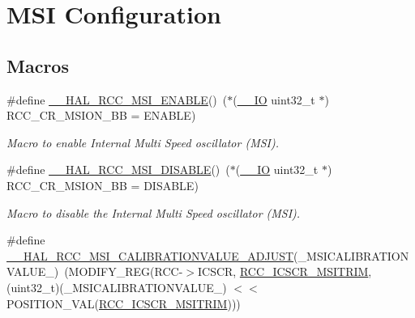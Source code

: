 \hypertarget{group___r_c_c___m_s_i___configuration}{\section{M\-S\-I Configuration}
\label{group___r_c_c___m_s_i___configuration}
}
\subsection*{Macros}
\begin{DoxyCompactItemize}
\item 
\#define \hyperlink{group___r_c_c___m_s_i___configuration_gaf6797e8502d134483ba092f5d4345c70}{\-\_\-\-\_\-\-H\-A\-L\-\_\-\-R\-C\-C\-\_\-\-M\-S\-I\-\_\-\-E\-N\-A\-B\-L\-E}()~($\ast$(\hyperlink{core__sc300_8h_aec43007d9998a0a0e01faede4133d6be}{\-\_\-\-\_\-\-I\-O} uint32\-\_\-t $\ast$) R\-C\-C\-\_\-\-C\-R\-\_\-\-M\-S\-I\-O\-N\-\_\-\-B\-B = E\-N\-A\-B\-L\-E)
\begin{DoxyCompactList}\small\item\em Macro to enable Internal Multi Speed oscillator (M\-S\-I). \end{DoxyCompactList}\item 
\#define \hyperlink{group___r_c_c___m_s_i___configuration_ga49c15fd232bd099f020e508fe9c3cd12}{\-\_\-\-\_\-\-H\-A\-L\-\_\-\-R\-C\-C\-\_\-\-M\-S\-I\-\_\-\-D\-I\-S\-A\-B\-L\-E}()~($\ast$(\hyperlink{core__sc300_8h_aec43007d9998a0a0e01faede4133d6be}{\-\_\-\-\_\-\-I\-O} uint32\-\_\-t $\ast$) R\-C\-C\-\_\-\-C\-R\-\_\-\-M\-S\-I\-O\-N\-\_\-\-B\-B = D\-I\-S\-A\-B\-L\-E)
\begin{DoxyCompactList}\small\item\em Macro to disable the Internal Multi Speed oscillator (M\-S\-I). \end{DoxyCompactList}\item 
\#define \hyperlink{group___r_c_c___m_s_i___configuration_ga6c1e051a956f43b1895e8b6c0572c45e}{\-\_\-\-\_\-\-H\-A\-L\-\_\-\-R\-C\-C\-\_\-\-M\-S\-I\-\_\-\-C\-A\-L\-I\-B\-R\-A\-T\-I\-O\-N\-V\-A\-L\-U\-E\-\_\-\-A\-D\-J\-U\-S\-T}(\-\_\-\-M\-S\-I\-C\-A\-L\-I\-B\-R\-A\-T\-I\-O\-N\-V\-A\-L\-U\-E\-\_\-)~(M\-O\-D\-I\-F\-Y\-\_\-\-R\-E\-G(R\-C\-C-\/$>$I\-C\-S\-C\-R, \hyperlink{group___peripheral___registers___bits___definition_ga7f61335b01758a4336598e7fa97445e6}{R\-C\-C\-\_\-\-I\-C\-S\-C\-R\-\_\-\-M\-S\-I\-T\-R\-I\-M}, (uint32\-\_\-t)(\-\_\-\-M\-S\-I\-C\-A\-L\-I\-B\-R\-A\-T\-I\-O\-N\-V\-A\-L\-U\-E\-\_\-) $<$$<$ P\-O\-S\-I\-T\-I\-O\-N\-\_\-\-V\-A\-L(\hyperlink{group___peripheral___registers___bits___definition_ga7f61335b01758a4336598e7fa97445e6}{R\-C\-C\-\_\-\-I\-C\-S\-C\-R\-\_\-\-M\-S\-I\-T\-R\-I\-M})))
$$
\end{DoxyCompactItemize}
